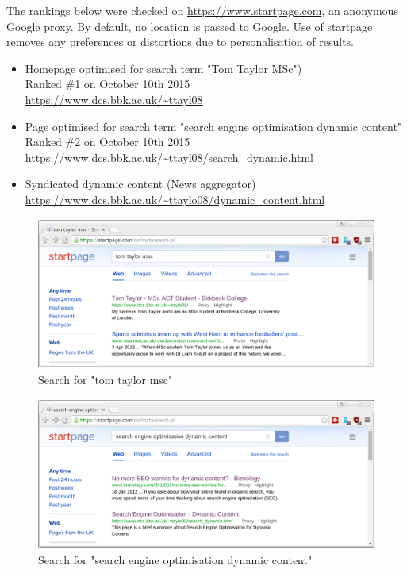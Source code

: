 \documentclass[a4paper,11pt]{article}
\begin{document}
The rankings below were checked on \url{https://www.startpage.com}, an anonymous Google proxy.  By default, no location is passed to Google.  Use of startpage removes any preferences or distortions due to personalisation of results.

\begin{itemize}

  \item Homepage optimised for search term "Tom Taylor MSc")\\
  Ranked \#1 on October 10th 2015\\
  \url{https://www.dcs.bbk.ac.uk/~ttayl08}

  \item Page optimised for search term "search engine optimisation dynamic content"\\
  Ranked \#2 on October 10th 2015 \\
  \url{https://www.dcs.bbk.ac.uk/~ttayl08/search_dynamic.html}

  \item Syndicated dynamic content (News aggregator)\\
  \url{https://www.dcs.bbk.ac.uk/~ttaylo08/dynamic_content.html}

\end{itemize}

\begin{figure}[h]
  \centering
  \includegraphics[height=5cm]{tom_taylor_msc.png}
  \caption{Search for "tom taylor msc"}
\end{figure}

\begin{figure}[h]
  \centering
  \includegraphics[height=5cm]{seo_dynamic.png}
  \caption{Search for "search engine optimisation dynamic content"}
\end{figure}
\end{document}
